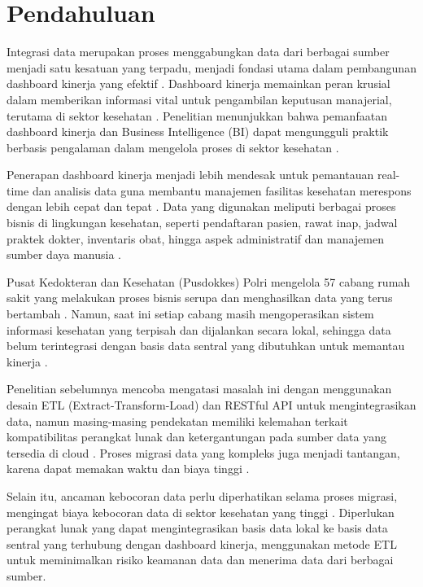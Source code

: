 \section{Pendahuluan}
\label{sec:pendahuluan}


Integrasi data merupakan proses menggabungkan data dari berbagai sumber menjadi satu kesatuan yang terpadu, menjadi fondasi utama dalam pembangunan dashboard kinerja yang efektif \cite{Neang2021DataIA, mutawalli2021pengembangan}. Dashboard kinerja memainkan peran krusial dalam memberikan informasi vital untuk pengambilan keputusan manajerial, terutama di sektor kesehatan \cite{Basile2023}. Penelitian menunjukkan bahwa pemanfaatan dashboard kinerja dan Business Intelligence (BI) dapat mengungguli praktik berbasis pengalaman dalam mengelola proses di sektor kesehatan \cite{CapitalLink2017}.

Penerapan dashboard kinerja menjadi lebih mendesak untuk pemantauan real-time dan analisis data guna membantu manajemen fasilitas kesehatan merespons dengan lebih cepat dan tepat \cite{Basile2023}. Data yang digunakan meliputi berbagai proses bisnis di lingkungan kesehatan, seperti pendaftaran pasien, rawat inap, jadwal praktek dokter, inventaris obat, hingga aspek administratif dan manajemen sumber daya manusia \cite{Basile2023}.

Pusat Kedokteran dan Kesehatan (Pusdokkes) Polri mengelola 57 cabang rumah sakit yang melakukan proses bisnis serupa dan menghasilkan data yang terus bertambah \cite{Aziz2023OptimalisasiPD}. Namun, saat ini setiap cabang masih mengoperasikan sistem informasi kesehatan yang terpisah dan dijalankan secara lokal, sehingga data belum terintegrasi dengan basis data sentral yang dibutuhkan untuk memantau kinerja \cite{Oliva2018}.

Penelitian sebelumnya mencoba mengatasi masalah ini dengan menggunakan desain ETL (Extract-Transform-Load) dan RESTful API untuk mengintegrasikan data, namun masing-masing pendekatan memiliki kelemahan terkait kompatibilitas perangkat lunak dan ketergantungan pada sumber data yang tersedia di cloud \cite{Firdaus2022MEMBANGUNID, Herfandi_Julkarnain_Hanif_2022}. Proses migrasi data yang kompleks juga menjadi tantangan, karena dapat memakan waktu dan biaya tinggi \cite{Elamparithi2015, Peng2023, Fana2021DataWD}.

Selain itu, ancaman kebocoran data perlu diperhatikan selama proses migrasi, mengingat biaya kebocoran data di sektor kesehatan yang tinggi \cite{Ponemon2023}. Diperlukan perangkat lunak yang dapat mengintegrasikan basis data lokal ke basis data sentral yang terhubung dengan dashboard kinerja, menggunakan metode ETL untuk meminimalkan risiko keamanan data dan menerima data dari berbagai sumber.


